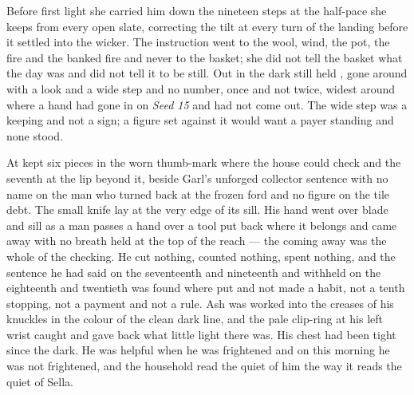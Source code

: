 Before first light she carried him down the nineteen steps at the half-pace she keeps from every open slate, correcting the tilt at every turn of the landing before it settled into the wicker. The instruction went to the wool,  wind, the pot, the fire and the banked fire and never to the basket; she did not tell the basket what the day was and did not tell it to be still. Out in  the dark still held , gone around with a look and a wide step and no number, once and not twice, widest around  where a hand had gone in on \emph{Seed 15} and had not come out. The wide step was a keeping and not a sign; a figure set against it would want a payer standing and none stood.

At   kept six pieces in the worn thumb-mark where the house could check and the seventh at the lip beyond it, beside Garl's unforged collector sentence with no name on the man who turned back at the frozen ford and no figure on the tile debt. The small knife lay at the very edge of its sill. His hand went over blade and sill as a man passes a hand over a tool put back where it belongs and came away with no breath held at the top of the reach --- the coming away was the whole of the checking. He cut nothing, counted nothing, spent nothing, and the sentence he had said on the seventeenth and nineteenth and withheld on the eighteenth and twentieth was found where put and not made a habit, not a tenth stopping, not a payment and not a rule. Ash was worked into the creases of his knuckles in the colour of the clean dark line, and the pale clip-ring at his left wrist caught and gave back what little light there was. His chest had been tight since the dark. He was helpful when he was frightened and on this morning he was not frightened, and the household read the quiet of him the way it reads the quiet of Sella.

